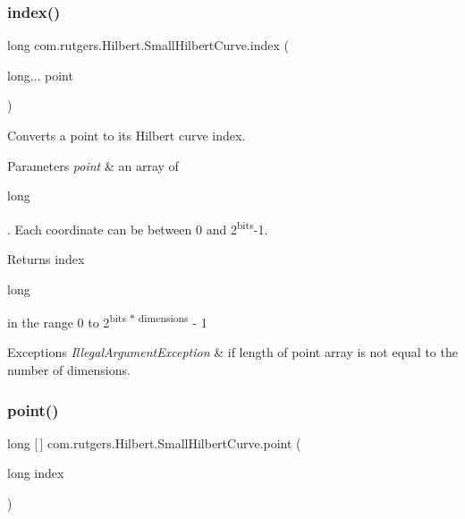 \subsubsection{\texorpdfstring{index()}{index()}}
{\footnotesize\ttfamily long com.\+rutgers.\+Hilbert.\+Small\+Hilbert\+Curve.\+index (\begin{DoxyParamCaption}\item[{long...}]{point }\end{DoxyParamCaption})}

Converts a point to its Hilbert curve index.


\begin{DoxyParams}{Parameters}
{\em point} & an array of
\begin{DoxyCode}
\textcolor{keywordtype}{long} 
\end{DoxyCode}
 . Each coordinate can be between 0 and 2\textsuperscript{bits}-\/1. \\
\hline
\end{DoxyParams}
\begin{DoxyReturn}{Returns}
index
\begin{DoxyCode}
\textcolor{keywordtype}{long} 
\end{DoxyCode}
 in the range 0 to 2\textsuperscript{bits $\ast$ dimensions} -\/ 1 
\end{DoxyReturn}

\begin{DoxyExceptions}{Exceptions}
{\em Illegal\+Argument\+Exception} & if length of point array is not equal to the number of dimensions. \\
\hline
\end{DoxyExceptions}
\mbox{\label{classcom_1_1rutgers_1_1Hilbert_1_1SmallHilbertCurve_a5b2954452f7072df01626959e4fbad8d}} 
\subsubsection{\texorpdfstring{point()}{point()}}
{\footnotesize\ttfamily long \mbox{[}$\,$\mbox{]} com.\+rutgers.\+Hilbert.\+Small\+Hilbert\+Curve.\+point (\begin{DoxyParamCaption}\item[{long}]{index }\end{DoxyParamCaption})}

